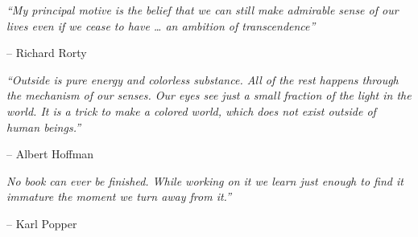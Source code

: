 \thispagestyle{empty}
\begin{center}
\large{\textit{``My principal motive is the belief that we can still make admirable sense of our lives even if we cease to have … an ambition of transcendence''}}
\end{center}
\begin{flushright}
-- Richard Rorty
\end{flushright}

\begin{center}
\large{\textit{``Outside is pure energy and colorless substance. All of the rest happens through the mechanism of our senses. Our eyes see just a small fraction of the light in the world. It is a trick to make a colored world, which does not exist outside of human beings.''}}
\end{center}
\begin{flushright}
-- Albert Hoffman
\end{flushright}


\begin{center}
\large{\textit {No book can ever be finished. While working on it we learn just enough to find it immature the moment we turn away from it.''}}
\end{center}
\begin{flushright}
-- Karl Popper
\end{flushright}

\clearpage
